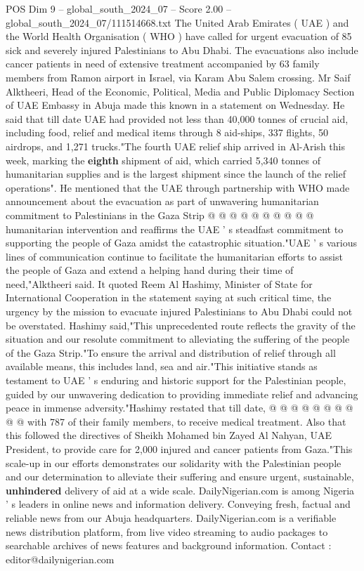\begin{textsample}{POS Dim 9 – global\_south\_2024\_07 – Score 2.00 – global\_south\_2024\_07/111514668.txt}  \label{ex:f9_pos_104}
The United Arab Emirates ( UAE ) and the World Health Organisation ( WHO ) have called for urgent evacuation of 85 sick and severely injured Palestinians to Abu Dhabi.
The evacuations also include cancer patients in need of extensive treatment accompanied by 63 family members from Ramon airport in Israel, via Karam Abu Salem crossing.
Mr Saif Alktheeri, Head of the Economic, Political, Media and Public Diplomacy Section of UAE Embassy in Abuja made this known in a statement on Wednesday.
He said that till date UAE had provided not less than 40,000 tonnes of crucial aid, including food, relief and medical items through 8 aid-ships, 337 flights, 50 airdrops, and 1,271 trucks."The fourth UAE relief ship arrived in Al-Arish this week, marking the \textbf{eighth} shipment of aid, which carried 5,340 tonnes of humanitarian supplies and is the largest shipment since the launch of the relief operations".
He mentioned that the UAE through partnership with WHO made announcement about the evacuation as part of unwavering humanitarian commitment to Palestinians in the Gaza Strip @ @ @ @ @ @ @ @ @ @ humanitarian intervention and reaffirms the UAE ' s steadfast commitment to supporting the people of Gaza amidst the catastrophic situation."UAE ' s various lines of communication continue to facilitate the humanitarian efforts to assist the people of Gaza and extend a helping hand during their time of need,"Alktheeri said.
It quoted Reem Al Hashimy, Minister of State for International Cooperation in the statement saying at such critical time, the urgency by the mission to evacuate injured Palestinians to Abu Dhabi could not be overstated.
Hashimy said,"This unprecedented route reflects the gravity of the situation and our resolute commitment to alleviating the suffering of the people of the Gaza Strip."To ensure the arrival and distribution of relief through all available means, this includes land, sea and air."This initiative stands as testament to UAE ' s enduring and historic support for the Palestinian people, guided by our unwavering dedication to providing immediate relief and advancing peace in immense adversity."Hashimy restated that till date, @ @ @ @ @ @ @ @ @ @ with 787 of their family members, to receive medical treatment.
Also that this followed the directives of Sheikh Mohamed bin Zayed Al Nahyan, UAE President, to provide care for 2,000 injured and cancer patients from Gaza."This scale-up in our efforts demonstrates our solidarity with the Palestinian people and our determination to alleviate their suffering and ensure urgent, sustainable, \textbf{unhindered} delivery of aid at a wide scale.
DailyNigerian.com is among Nigeria ' s leaders in online news and information delivery.
Conveying fresh, factual and reliable news from our Abuja headquarters.
DailyNigerian.com is a verifiable news distribution platform, from live video streaming to audio packages to searchable archives of news features and background information.
Contact : editor@dailynigerian.com

\end{textsample}

